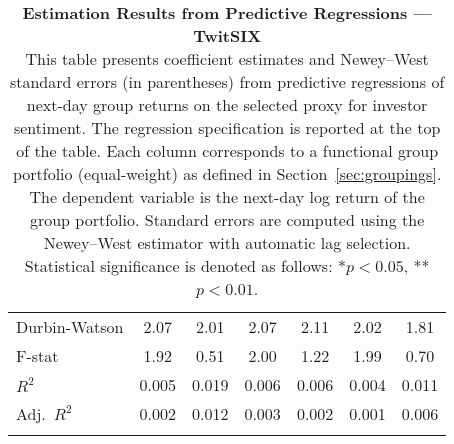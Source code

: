 \begin{table}[ht]
\begin{tabular}{l *{6}{c}}
Durbin-Watson & 2.07 & 2.01 & 2.07 & 2.11 & 2.02 & 1.81 \\
F-stat & 1.92 & 0.51 & 2.00 & 1.22 & 1.99 & 0.70 \\
\(R^2\) & 0.005 & 0.019 & 0.006 & 0.006 & 0.004 & 0.011 \\
Adj.\ \(R^2\) & 0.002 & 0.012 & 0.003 & 0.002 & 0.001 & 0.006 \\
\addlinespace
\midrule
\multicolumn{7}{c}{Specification tested: $R_{g,t+1} = \alpha_g + \beta_{sent,g} S_t + \phi R_{g,t} + \theta B_{g,t} + \gamma M_t + \varepsilon_{g,t+1}$}\\
\bottomrule
\end{tabular}
\caption{\textbf{Estimation Results from Predictive Regressions — TwitSIX} \\
This table presents coefficient estimates and Newey--West standard errors (in parentheses) from predictive regressions of next-day group returns on the selected proxy for investor sentiment.
The regression specification is reported at the top of the table. Each column corresponds to a functional group portfolio (equal-weight) as defined in Section~\ref{sec:groupings}.
The dependent variable is the next-day log return of the group portfolio. Standard errors are computed using the Newey--West estimator with automatic lag selection. Statistical significance is denoted as follows: *$p<0.05$, **$p<0.01$.}
\label{tab:h2_twitsix_results}
\end{table}
